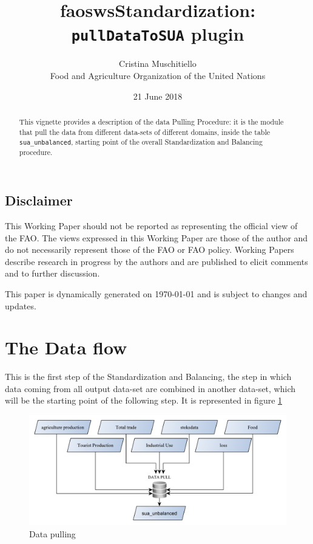 \documentclass[]{article}
\title{faoswsStandardization:\\
\texttt{pullDataToSUA} plugin}
\author{Cristina Muschitiello\\
Food and Agriculture Organization of the United Nations}
\date{21 June 2018}
\begin{document}
\maketitle
\begin{abstract}
This vignette provides a description of the data Pulling Procedure: it
is the module that pull the data from different data-sets of different
domains, inside the table \texttt{sua\_unbalanced}, starting point of
the overall Standardization and Balancing procedure.
\end{abstract}

{
\setcounter{tocdepth}{4}
\tableofcontents
}
\newpage

\listoffigures

\subsection*{Disclaimer}\label{disclaimer}

This Working Paper should not be reported as representing the official
view of the FAO. The views expressed in this Working Paper are those of
the author and do not necessarily represent those of the FAO or FAO
policy. Working Papers describe research in progress by the authors and
are published to elicit comments and to further discussion.

This paper is dynamically generated on \today{} and is subject to
changes and updates.

\newpage

\section*{The Data flow}\label{the-data-flow}

This is the first step of the Standardization and Balancing, the step in
which data coming from all output data-set are combined in another
data-set, which will be the starting point of the following step. It is
represented in figure \ref{fig:f1}

\begin{figure}[H]

{\centering \includegraphics[width=1\linewidth]{images/pullData/01_pulldata} 

}

\caption{\label{fig:f1}Data pulling}\label{fig:f1}
\end{figure}
\end{document}
